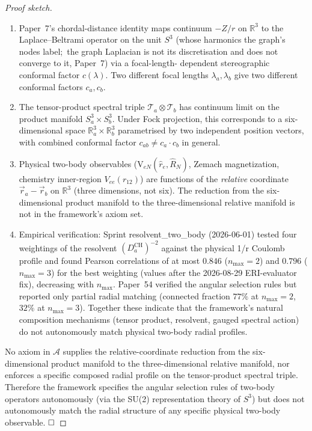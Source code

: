 \documentclass[11pt]{article}
\begin{document}
\begin{proof}[Proof sketch]
\begin{enumerate}\setlength{\itemsep}{1pt}
\item Paper~7's chordal-distance identity maps continuum $-Z/r$ on
  $\mathbb{R}^3$ to the Laplace--Beltrami operator on the unit $S^3$
  (whose harmonics the graph's nodes label;\ the graph Laplacian is not
  its discretisation and does not converge to it, Paper~7) via a focal-length-
  dependent stereographic conformal factor $c(\lambda)$.  Two
  different focal lengths $\lambda_a, \lambda_b$ give two different
  conformal factors $c_a, c_b$.
\item The tensor-product spectral triple
  $\mathcal{T}_a \otimes \mathcal{T}_b$ has continuum limit on the
  product manifold $S^3_a \times S^3_b$.  Under Fock projection, this
  corresponds to a six-dimensional space
  $\mathbb{R}^3_a \times \mathbb{R}^3_b$ parametrised by two
  independent position vectors, with combined conformal factor
  $c_{ab} \neq c_a \cdot c_b$ in general.
\item Physical two-body observables (V$_{eN}(\hat r_e, \hat R_N)$,
  Zemach magnetization, chemistry inner-region $V_{ee}(r_{12})$) are
  functions of the \emph{relative} coordinate $\vec r_a - \vec r_b$
  on $\mathbb{R}^3$ (three dimensions, not six).  The reduction from
  the six-dimensional product manifold to the three-dimensional
  relative manifold is not in the framework's axiom set.
\item Empirical verification:  Sprint resolvent\_two\_body
  (2026-06-01)
  tested four weightings of the resolvent
  $(D_a^{\mathrm{CH}})^{-2}$ against the physical 1/r Coulomb profile
  and found Pearson correlations of at most $0.846$ ($n_{\max} = 2$)
  and $0.796$ ($n_{\max} = 3$) for the best weighting (values after
  the 2026-08-29 ERI-evaluator fix), decreasing with $n_{\max}$.
  Paper~54 verified the angular selection rules but reported only
  partial radial matching (connected fraction $77\%$ at
  $n_{\max} = 2$, $32\%$ at $n_{\max} = 3$).
  Together these indicate that the framework's natural composition
  mechanisms (tensor product, resolvent, gauged spectral action) do
  not autonomously match physical two-body radial profiles.
\end{enumerate}

No axiom in $\mathcal{A}$ supplies the relative-coordinate reduction
from the six-dimensional product manifold to the three-dimensional
relative manifold, nor enforces a specific composed radial profile
on the tensor-product spectral triple.  Therefore the framework
specifies the angular selection rules of two-body operators
autonomously (via the SU(2) representation theory of $S^3$) but does not
autonomously match the radial structure of any specific physical
two-body observable. $\hfill\square$
\end{proof}
\end{document}
